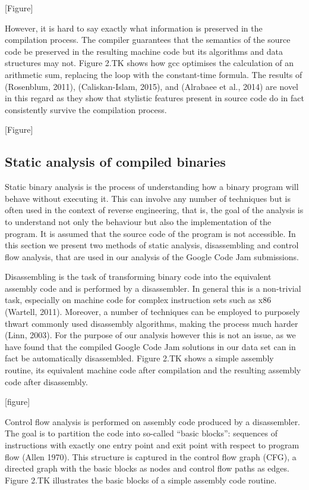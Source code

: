 \documentclass[a4paper,11pt]{kth-mag}
\begin{document}
[Figure]

However, it is hard to say exactly what information is preserved in the
compilation process. The compiler guarantees that the semantics of the source
code be preserved in the resulting machine code but its algorithms and data
structures may not. Figure 2.TK shows how gcc optimises the calculation of an
arithmetic sum, replacing the loop with the constant-time formula. The results
of (Rosenblum, 2011), (Caliskan-Islam, 2015), and (Alrabaee et al., 2014) are
novel in this regard as they show that stylistic features present in source
code do in fact consistently survive the compilation process.

[Figure]
\subsection{Static analysis of compiled binaries}
Static binary analysis is the process of understanding how a binary program
will behave without executing it. This can involve any number of techniques
but is often used in the context of reverse engineering, that is, the goal of
the analysis is to understand not only the behaviour but also the
implementation of the program. It is assumed that the source code of the
program is not accessible. In this section we present two methods of static
analysis, disassembling and control flow analysis, that are used in our
analysis of the Google Code Jam submissions.

Disassembling is the task of transforming binary code into the equivalent
assembly code and is performed by a disassembler. In general this is a
non-trivial task, especially on machine code for complex instruction sets such
as x86 (Wartell, 2011). Moreover, a number of techniques can be employed to
purposely thwart commonly used disassembly algorithms, making the process much
harder (Linn, 2003). For the purpose of our analysis however this is not an
issue, as we have found that the compiled Google Code Jam solutions in our data
set can in fact be automatically disassembled. Figure 2.TK shows a simple
assembly routine, its equivalent machine code after compilation and the
resulting assembly code after disassembly.

[figure]

Control flow analysis is performed on assembly code produced by a disassembler.
The goal is to partition the code into so-called “basic blocks”: sequences of
instructions with exactly one entry point and exit point with respect to
program flow (Allen 1970). This structure is captured in the control flow graph
(CFG), a directed graph with the basic blocks as nodes and control flow paths
as edges. Figure 2.TK illustrates the basic blocks of a simple assembly code
routine.
\end{document}
